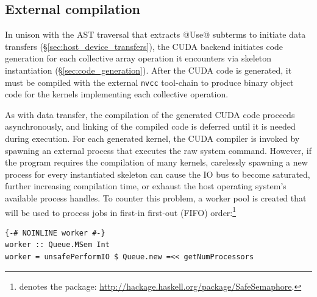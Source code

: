 \subsection{External compilation}
\label{sec:external_compilation}

In unison with the AST traversal that extracts @Use@ subterms to initiate
data transfers (\S\ref{sec:host_device_transfers}), the CUDA backend initiates
code generation for each collective array operation it encounters via skeleton
instantiation (\S\ref{sec:code_generation}). After the CUDA code is generated,
it must be compiled with the external \texttt{nvcc} tool-chain to produce binary
object code for the kernels implementing each collective operation.

As with data transfer, the compilation of the generated CUDA code proceeds
asynchronously, and linking of the compiled code is deferred until it is needed
during execution. For each generated kernel, the CUDA compiler is invoked by
spawning an external process that executes the raw system command. However, if
the program requires the compilation of many kernels, carelessly spawning a new
process for every instantiated skeleton can cause the IO bus to become
saturated, further increasing compilation time, or exhaust the host operating
system's available process handles. To counter this problem, a worker pool is
created that will be used to process jobs in first-in first-out (FIFO)
order:\footnote{ denotes the  package:
\url{http://hackage.haskell.org/package/SafeSemaphore}.}

\begin{lstlisting}[style=haskell]
{-# NOINLINE worker #-}
worker :: Queue.MSem Int
worker = unsafePerformIO $ Queue.new =<< getNumProcessors
\end{lstlisting}

